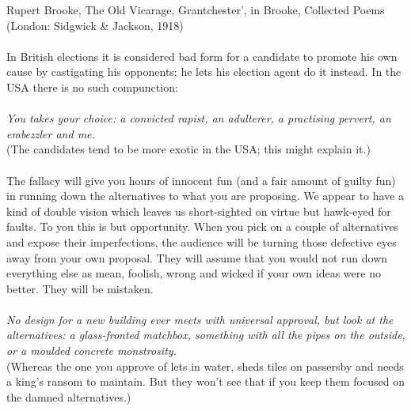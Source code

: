 \documentclass[a4paper,12pt,single,pdftex]{scrartcl}
\begin{document}
    
      Rupert Brooke, The Old Vicarage, Grantchester’, in Brooke, Collected Poems (London: Sidgwick \& Jackson, 1918)
    \\

    
       
    \\

    
      In British elections it is considered bad form for a candidate to promote his own cause by castigating his opponents; he lets his election agent do it instead. In the USA there is no such compunction:
    \\

    
       
    \\

    
      {\em You takes your choice: a convicted rapist, an adulterer, a practising pervert, an embezzler and me.}
    \\

    
      (The candidates tend to be more exotic in the USA; this might explain it.)
    \\

    
       
    \\

    
      The fallacy will give you hours of innocent fun (and a fair amount of guilty fun) in running down the alternatives to what you are proposing. We appear to have a kind of double vision which leaves us short-sighted on virtue but hawk-eyed for faults. To you this is but opportunity. When you pick on a couple of alternatives and expose their imperfections, the audience will be turning those defective eyes away from your own proposal. They will assume that you would not run down everything else as mean, foolish, wrong and wicked if your own ideas were no better. They will be mistaken.
    \\

    
       
    \\

    
      {\em No design for a new building ever meets with universal approval, but look at the alternatives: a glass-fronted matchbox, something with all the pipes on the outside, or a moulded concrete monstrosity.}
    \\

    
      (Whereas the one you approve of lets in water, sheds tiles on passersby and needs a king’s ransom to maintain. But they won’t see that if you keep them focused on the damned alternatives.)
    \\
\end{document}
